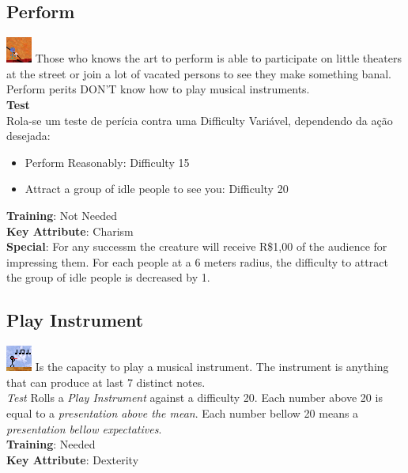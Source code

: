 \documentclass[ letterpaper,12pt]{article}
\begin{document}
\subsection{Perform} 
\includegraphics{../data/skills/Img/performar.png}
Those who knows the art to perform is able to participate on little theaters at the street or join a lot of vacated persons to see they make something banal. Perform perits DON'T know how to play musical instruments.\\
{\bf Test}\\
Rola-se um teste de perícia contra uma Difficulty Variável, dependendo da ação desejada:
\begin{itemize}
\item{Perform Reasonably: Difficulty 15}
\item{Attract a group of idle people to see you: Difficulty 20}
\end{itemize}
{\bf Training}: Not Needed\\
{\bf Key Attribute}: Charism\\
{\bf Special}: For any successm the creature will receive R\$1,00 of the audience for impressing them. For each people at a 6 meters radius, the difficulty to attract the group of idle people is decreased by 1.

\subsection{Play Instrument}
\includegraphics{../data/skills/Img/tocarinst.png}
Is the capacity to play a musical instrument. The instrument is anything that can produce at last 7 distinct notes.\\
{\it Test}
Rolls a {\it Play Instrument} against a difficulty 20. Each number above 20 is equal to a {\it presentation above the mean}. Each number bellow 20 means a {\it presentation bellow expectatives}.\\
{\bf Training}: Needed\\
{\bf Key Attribute}: Dexterity\\
\end{document}
